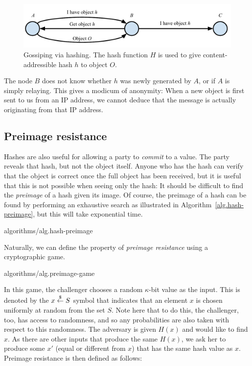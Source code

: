 \begin{figure}
    \centering
    \includegraphics[width=\columnwidth,keepaspectratio]{figures/gossiping-via-hashing.pdf}
    \caption{Gossiping via hashing. The hash function $H$ is used to give content-addressible hash $h$ to object $O$.}
    \label{fig:gossiping-via-hashing}
\end{figure}

The node $B$ does not know whether $h$ was newly generated by $A$, or if $A$ is simply relaying.
This gives a modicum of anonymity: When a new object is first sent to us from an IP address,
we cannot deduce that the message is actually originating from that IP address.

\subsection*{Preimage resistance}

Hashes are also useful for allowing a party to \emph{commit} to a value. The party
reveals that hash, but not the object itself. Anyone who has the hash can verify that
the object is correct once the full object has been received, but it is useful that
this is not possible when seeing only the hash: It should be difficult to find the
\emph{preimage} of a hash given its image. Of course, the preimage of a hash can
be found by performing an exhaustive search as illustrated in Algorithm~\ref{alg.hash-preimage},
but this will take exponential time.

{algorithms/alg.hash-preimage}

Naturally, we can define the property of \emph{preimage resistance} using a
cryptographic game.

{algorithms/alg.preimage-game}

In this game, the challenger chooses a random $\kappa$-bit value as the input. This is denoted by
the $x \overset{\$}{\gets} S$ symbol that indicates that an element $x$ is chosen uniformly at random
from the set $S$. Note here that to do this, the challenger, too, has access to randomness,
and so any probabilities are also taken with respect to this randomness.
The adversary is given $H(x)$ and would like to find $x$.
As there are other inputs that produce the same $H(x)$,
we ask her to produce some $x'$ (equal or different from $x$) that has the same hash value
as $x$. Preimage resistance is then defined as follows:

